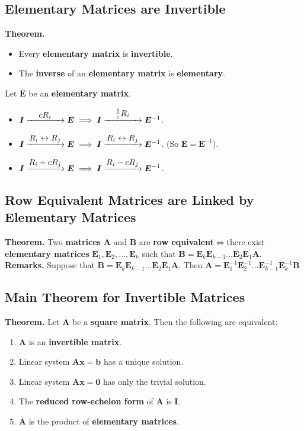 \documentclass[../ma2001_notes.tex]{subfiles}
\begin{document}
\subsection{Elementary Matrices are Invertible}
\textbf{Theorem.}
\begin{itemize}
	\item Every \textbf{elementary matrix} is \textbf{invertible}.
	\item The \textbf{inverse} of an \textbf{elementary matrix} is \textbf{elementary}.
\end{itemize}
Let \(\bm{E}\) be an \textbf{elementary matrix}.
\begin{itemize}
	\item\(\bm{I}\ro{$$cR_i$$}\bm{E}\implies\bm{I}\ro{$$\frac{1}{c}R_i$$}\bm{E}^{-1}\).
	\item\(\bm{I}\ro{$$R_i\leftrightarrow R_j$$}\bm{E}\implies\bm{I}\ro{$$R_i\leftrightarrow R_j$$}\bm{E}^{-1}\). (So \(\bm{E}=\bm{E}^{-1}\)).
	\item\(\bm{I}\ro{$$R_i+cR_j$$}\bm{E}\implies\bm{I}\ro{$$R_i-cR_j$$}\bm{E}^{-1}\).
\end{itemize}

\subsection{Row Equivalent Matrices are Linked by Elementary Matrices}
\textbf{Theorem.} Two \textbf{matrices} \(\bm{A}\) and \(\bm{B}\) are \textbf{row equivalent}\(\iff\)there exist \textbf{elementary matrices} \(\bm{E}_1,\bm{E}_2,\ldots,\bm{E}_k\) such that \(\bm{B}=\bm{E}_k\bm{E}_{k-1}\ldots\bm{E}_2\bm{E}_1\bm{A}\). \\
\textbf{Remarks.} Suppose that \(\bm{B}=\bm{E}_k\bm{E}_{k-1}\ldots\bm{E}_2\bm{E}_1\bm{A}\). Then \(\bm{A}=\bm{E}_1^{-1}\bm{E}_2^{-1}\ldots\bm{E}_{k-1}^{-1}\bm{E}_k^{-1}\bm{B}\)

\subsection{Main Theorem for Invertible Matrices}
\textbf{Theorem.} Let \(\bm{A}\) be a \textbf{square matrix}. Then the following are equivalent:
\begin{enumerate}
	\item\(\bm{A}\) is an \textbf{invertible matrix}.
	\item Linear system \(\bm{Ax}=\bm{b}\) has a unique solution.
	\item Linear system \(\bm{Ax}=\bm{0}\) has only the trivial solution.
	\item The \textbf{reduced row-echelon form} of \(\bm{A}\) is \(\bm{I}\).
	\item\(\bm{A}\) is the product of \textbf{elementary matrices}.
\end{enumerate}
\end{document}

